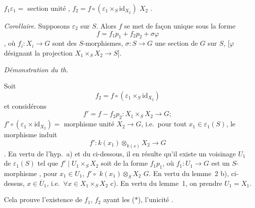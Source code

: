\documentclass[11pt,a4paper]{article}
\begin{document}
$f_1 \varepsilon_1 = $ section unité ,  $f_2 = f \circ (\varepsilon_1 \times_S \mathrm{id}_{X_2})$  \struck{[ \ill{} $\varphi_2$ soit une \ill{} $f_2 = $ ]}  \ill{} $X_2$ \ill{}.

\emph{Corollaire.} Supposons \ill{}  $\varepsilon_2$ sur $S$. Alors $f$ se met de façon unique sous la forme
\[
  f = f_1 p_1 + f_2 p_2 + \sigma \varphi
\]
, où $f_i \colon X_i \to G$ sont des $S$-morphismes, $\sigma \colon S \to G$ une section de $G$ sur $S$, [$\varphi$ désignant  la projection $X_1 \times_S X_2 \to S$].

\emph{Démonstration du th.}

Soit
\[
  f_2 = f \circ (\varepsilon_1 \times_S \mathrm{id}_{X_2})
\]
et considérons
\[
  f' = f - f_2 p_2 \colon X_1 \times_S X_2 \longrightarrow G ;
\]
\ill{} \ill{} \ill{} \ill{} \ill{} \ill{} $f' \circ (\varepsilon_1 \times \mathrm{id}_{X_2}) = $ morphisme unité $X_2 \to G$, i.e.\ pour tout $x_1 \in \varepsilon_1(S)$, le morphisme induit
\[
  f' \colon k(x_1) \otimes_{k(s)} X_2 \longrightarrow G
\]
\ill{} \ill{} \ill{} \ill{} . En vertu de l'hyp.\ a) et du  \ill{} ci-dessous, il en résulte qu'il existe un voisinage $U_1$ de $\varepsilon_1(S)$ tel que $f' \mid U_1 \times_S X_2$ soit de la forme $f_1 p_1$, où $f_1 \colon U_1 \to G$ est un $S$-morphisme , \ill{} \ill{} pour $x_1 \in U_1$, $f' \circ$ \ill{} \ill{} $k(x_1) \otimes_S X_2$ \ill{} \ill{} \ill{} \ill{} \ill{} $G$. En vertu du lemme~2 \struck{\ill{}}  b), \ill{} \ill{} \ill{} \ill{} \ill{} ci-dessus,  \ill{} \ill{} \ill{} \ill{} $x \in \overline{U}_1$, i.e.\ $\forall x \in X_1 \times_S X_2$ \ill{} \ill{} c). En vertu du lemme~1, on \ill{} \ill{} \ill{} prendre $U_1 = X_1$.

Cela prouve l'existence de $f_1$, $f_2$ ayant les  ($\ast$), l'unicité  \ill{} \ill{}  \struck{\ill{} \ill{} \ill{} \ill{} \ill{}}  \ill{} \ill{} \ill{} \ill{}.
\end{document}
